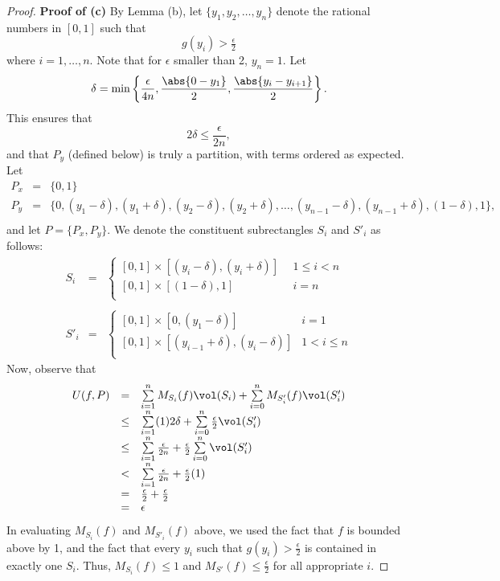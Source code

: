 \documentclass[letterpaper]{article}
\begin{document}
\begin{enumerate}
\begin{proof}
\textbf{Proof of (c)} By Lemma (b), let $\{y_1, y_2, \dots, y_n\}$ denote the rational numbers in $[0,1]$ such that
$$g(y_i)>\tfrac{\epsilon}{2}$$ 
where $i= 1,\dots, n$. Note that for $\epsilon$ smaller than 2, $y_n=1$. Let
$$\delta=\min\left\lbrace\frac{\epsilon}{4n}, \frac{\abs{0-y_1}}{2}, \frac{\abs{y_i-y_{i+1}}}{2}\right\rbrace.$$
This ensures that 
$$2\delta\leq\frac{\epsilon}{2n},$$
and that $P_y$ (defined below) is truly a partition, with terms ordered as expected. 
Let 
\[
\begin{array}{rcl}
P_x&=&\{0,1\}\\
P_y&=&\{0, (y_1-\delta), (y_1+\delta), (y_2-\delta), (y_2+\delta), \dots, (y_{n-1}-\delta), (y_{n-1}+\delta), (1-\delta), 1\},\\
\end{array}
\]
and let $P=\{P_x, P_y\}$. We denote the constituent subrectangles $S_i$ and $S'_i$ as follows:
\[
\begin{array}{rcl}
S_i &=&
\begin{cases}
[0,1]\times[(y_i-\delta), (y_i+\delta)] \phantom{\delta} & 1\leq i< n\\
[0,1]\times[(1-\delta), 1] & i=n\\
\end{cases}\\
\\
S'_i &=& 
\begin{cases}
[0,1]\times[0, (y_1-\delta)] & i=1\\
[0,1]\times[(y_{i-1}+\delta), (y_i-\delta)] & 1<i\leq n \\
\end{cases}
\end{array}
\]
Now, observe that 
\[
\begin{array}{rcl}
U(f,P)&=&\sum\limits_{i=1}^n M_{S_i}(f)\vol(S_i) + \sum\limits_{i=0}^n M_{S'_i}(f)\vol(S'_i)\\
&\leq&\sum\limits_{i=1}^n (1)2\delta + \sum\limits_{i=0}^n \frac{\epsilon}{2}\vol(S'_i)\\
&\leq&\sum\limits_{i=1}^n \frac{\epsilon}{2n} + \frac{\epsilon}{2}\sum\limits_{i=0}^n \vol(S'_i)\\
&<&\sum\limits_{i=1}^n \frac{\epsilon}{2n} + \frac{\epsilon}{2}(1)\\
&=& \frac{\epsilon}{2} + \frac{\epsilon}{2}\\
&=& \epsilon\\
\end{array}
\]
In evaluating $M_{S_i}(f)$ and $M_{S'_i}(f)$ above, we used the fact that $f$ is bounded above by 1, and the fact that every $y_i$ such that $g(y_i)>\frac{\epsilon}{2}$ is contained in exactly one $S_i$. Thus, $M_{S_i}(f)\leq 1$ and $M_{S'}(f)\leq \frac{\epsilon}{2}$ for all appropriate $i$. 


\end{proof}
\end{enumerate}
\end{document}
